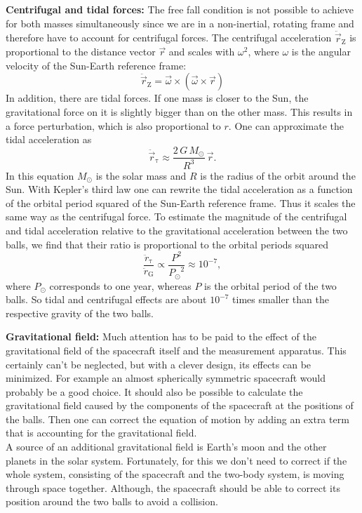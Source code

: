 \documentclass[prb,preprint]{revtex4-1}
\begin{document}
\textbf{Centrifugal and tidal forces:}
\label{sec:tidal}
The free fall condition is not possible to achieve for both masses simultaneously since we are in a non-inertial, rotating frame and therefore have to account for centrifugal forces. The centrifugal acceleration $\ddot{\vec{r}}_{\mathrm{Z}}$ is proportional to the distance vector $\vec{r}$ and scales with $\omega^2$, where $\omega$ is the angular velocity of the Sun-Earth reference frame:
\begin{equation}
\label{eq:centrifugalacc}
\ddot{\vec{r}}_{\mathrm{Z}} = \vec{\omega} \times \left( \vec{\omega} \times \vec{r} \right) 
\end{equation}
In addition, there are tidal forces. If one mass is closer to the Sun, the gravitational force on it is slightly bigger than on the other mass. This results in a force perturbation, which is also proportional to $r$. One can approximate the tidal acceleration as
\begin{equation}
\label{eq:tidalacc}
\ddot{\vec{r}}_{\mathrm{\tau}} \approx \frac{2 \, G \, M_\odot}{R^3} \, \vec{r}.
\end{equation}
In this equation $M_\odot$ is the solar mass and $R$ is the radius of the orbit around the Sun. With Kepler's third law one can rewrite the tidal acceleration as a function of the orbital period squared of the Sun-Earth reference frame. Thus it scales the same way as the centrifugal force. To estimate the magnitude of the centrifugal and tidal acceleration relative to the gravitational acceleration between the two balls, we find that their ratio is proportional to the orbital periods squared
\begin{equation}\label{a_ratio}
\frac{\ddot{r}_{\mathrm{\tau}}}{\ddot{r}_\mathrm{G}} \propto \frac{P^2}{{P_\odot}^2} \approx 10^{-7},
\end{equation}
where $P_\odot$ corresponds to one year, whereas $P$ is the orbital period of the two balls. So tidal and centrifugal effects are about $10^{-7}$ times smaller than the respective gravity of the two balls.

\textbf{Gravitational field:}
Much attention has to be paid to the effect of the gravitational field of the spacecraft itself and the measurement apparatus. This certainly can't be neglected, but with a clever design, its effects can be minimized. For example an almost spherically symmetric spacecraft would probably be a good choice. It should also be possible to calculate the gravitational field caused by the components of the spacecraft at the positions of the balls. Then one can correct the equation of motion by adding an extra term that is accounting for the gravitational field. \\
A source of an additional gravitational field is Earth's moon and the other planets in the solar system. Fortunately, for this we don't need to correct if the whole system, consisting of the spacecraft and the two-body system, is moving through space together. Although, the spacecraft should be able to correct its position around the two balls to avoid a collision.
\end{document}
